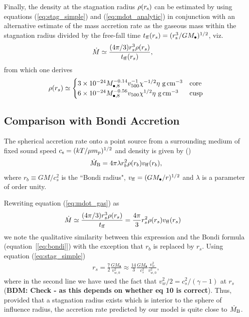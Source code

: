 \documentclass[usenatbib,fleqn]{mn2e}
\newcommand{\rs}{r_s}
\newcommand{\rb}{r_b}
\newcommand{\Mbh}[1][]{M_{\bullet#1}}
\newcommand{\Mbheight}{M_{\bullet,8}}
\newcommand{\ff}{\rm ff}
\newcommand{\vwO}{v_{w,0}}
\begin{document}
Finally, the density at the stagnation radius $\rho(r_{\rm s})$ can be estimated by using equations (\ref{eq:stag_simple}) and (\ref{eq:mdot_analytic}) in conjunction with an alternative estimate of the mass accretion rate as the gaseous mass within the stagnation radius divided by the free-fall time $t_{\rm ff}(\rs) = (r_{\rm s}^{3}/GM_{\bullet})^{1/2}$, viz.
\begin{align}
  &\dot{M}\simeq\frac{(4 \pi/3) \rs^3 \rho(\rs)}{t_{\ff}(\rs)},
  \label{eq:mdot_gas}
\end{align}
from which one derives 
\begin{align}
  \rho(\rs)\simeq
  \begin{cases}
    3 \times 10^{-24} \Mbheight^{-0.14} v_{500}^{-1} \chi^{-1/2} \eta \,
    \, {\rm g \, cm^{-3}}& \text{core}\\
    6 \times 10^{-24}  \Mbheight^{-0.56} v_{500}  \chi^{1/2}  \eta \,\, {\rm g \,cm^{-3}} & \text{cusp}
  \end{cases}
  \label{eq:rhors}
\end{align}


\subsection{Comparison with Bondi Accretion}
The spherical accretion rate onto a point source from a surrounding medium of fixed sound speed $c_{\rm s} = (kT/\mu m_p)^{1/2}$ and density is given by (\citealt{Bondi52}) 
\begin{align}
  \dot{M}_{\rm B} =4\pi \lambda r_b^2 \rho(r_b) v_{\rm ff}(r_b),
\label{eq:bondi}
\end{align}
where $r_b \equiv GM/c_{s}^{2}$ is the ``Bondi radius", $v_{\rm ff} = (GM_{\bullet}/r)^{1/2}$ and $\lambda$ is a parameter of order unity.  

Rewriting equation (\ref{eq:mdot_gas}) as
\begin{align}
  &\dot{M}\simeq\frac{(4 \pi/3) \rs^3 \rho(\rs)}{t_{\ff}} =\frac{4 \pi}{3} \rs^2 \rho(\rs) v_{\ff}(\rs)
\end{align}
we note the qualitative similarity between this expression and the Bondi formula (equation~[\ref{eq:bondi}]) with the exception that $\rb$ is replaced by $\rs$.  Using equation (\ref{eq:stag_simple})
\begin{align}
  \rs=\frac{7}{2}\frac{G \Mbh}{\vwO^2} \approx \frac{14}{3}\frac{GM_{\bullet}}{c_{s}^{2}}\frac{v_{w}^{2}}{v_{w,0}^{2}},
  \label{eq:rs_simple}
\end{align}
where in the second line we have used the fact that $v_{w}^{2}/2 =
c_s^2/(\gamma-1)$ at $\rs$ ({\bf BDM: Check - as this depends on
  whether eq 10 is correct}).  Thus, provided that a stagnation radius
exists which is interior to the sphere of influence radius, the
accretion rate predicted by our model is quite close to $\dot{M}_{\rm
  B}$.
\end{document}
